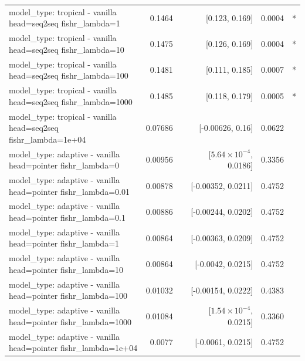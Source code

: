 \documentclass[10pt]{article}
\makeatletter
\newcommand{\stackcell}[1]{\begin{tabular}[t]{@{}l@{}}#1\end{tabular}}
\makeatother
\begin{document}
{\begin{longtable}{lrrrl}
\stackcell{model\_type: tropical - vanilla\\\footnotesize head=seq2seq fishr\_lambda=1 } & 0.1464 & [0.123, 0.169] & 0.0004 & *\\
\stackcell{model\_type: tropical - vanilla\\\footnotesize head=seq2seq fishr\_lambda=10 } & 0.1475 & [0.126, 0.169] & 0.0004 & *\\
\stackcell{model\_type: tropical - vanilla\\\footnotesize head=seq2seq fishr\_lambda=100 } & 0.1481 & [0.111, 0.185] & 0.0007 & *\\
\stackcell{model\_type: tropical - vanilla\\\footnotesize head=seq2seq fishr\_lambda=1000 } & 0.1485 & [0.118, 0.179] & 0.0005 & *\\
\stackcell{model\_type: tropical - vanilla\\\footnotesize head=seq2seq fishr\_lambda=1e+04 } & 0.07686 & [-0.00626, 0.16] & 0.0622 & \\
\stackcell{model\_type: adaptive - vanilla\\\footnotesize head=pointer fishr\_lambda=0 } & 0.00956 & [$5.64\times10^{-4}$, 0.0186] & 0.3356 & \\
\stackcell{model\_type: adaptive - vanilla\\\footnotesize head=pointer fishr\_lambda=0.01 } & 0.00878 & [-0.00352, 0.0211] & 0.4752 & \\
\stackcell{model\_type: adaptive - vanilla\\\footnotesize head=pointer fishr\_lambda=0.1 } & 0.00886 & [-0.00244, 0.0202] & 0.4752 & \\
\stackcell{model\_type: adaptive - vanilla\\\footnotesize head=pointer fishr\_lambda=1 } & 0.00864 & [-0.00363, 0.0209] & 0.4752 & \\
\stackcell{model\_type: adaptive - vanilla\\\footnotesize head=pointer fishr\_lambda=10 } & 0.00864 & [-0.0042, 0.0215] & 0.4752 & \\
\stackcell{model\_type: adaptive - vanilla\\\footnotesize head=pointer fishr\_lambda=100 } & 0.01032 & [-0.00154, 0.0222] & 0.4383 & \\
\stackcell{model\_type: adaptive - vanilla\\\footnotesize head=pointer fishr\_lambda=1000 } & 0.01084 & [$1.54\times10^{-4}$, 0.0215] & 0.3360 & \\
\stackcell{model\_type: adaptive - vanilla\\\footnotesize head=pointer fishr\_lambda=1e+04 } & 0.0077 & [-0.0061, 0.0215] & 0.4752 & \\

\end{longtable}}
\end{document}

